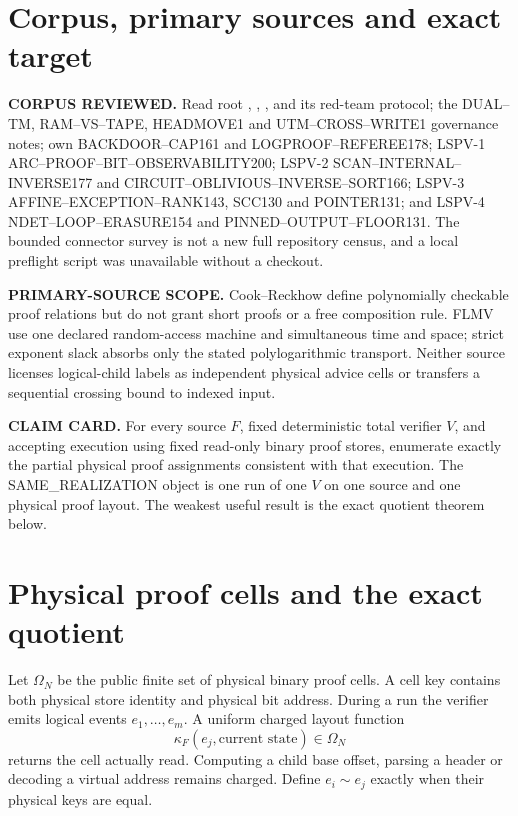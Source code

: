 \documentclass[11pt]{article}
\begin{document}
\section{Corpus, primary sources and exact target}
\textbf{CORPUS REVIEWED.}
Read root , , ,
 and its red-team protocol;
the DUAL--TM, RAM--VS--TAPE, HEADMOVE1 and UTM--CROSS--WRITE1 governance
notes; own BACKDOOR--CAP161 and LOGPROOF--REFEREE178; LSPV-1
ARC--PROOF--BIT--OBSERVABILITY200; LSPV-2 SCAN--INTERNAL--INVERSE177 and
CIRCUIT--OBLIVIOUS--INVERSE--SORT166; LSPV-3
AFFINE--EXCEPTION--RANK143, SCC130 and POINTER131; and LSPV-4
NDET--LOOP--ERASURE154 and PINNED--OUTPUT--FLOOR131. The bounded connector
survey is not a new full repository census, and a local preflight script was
unavailable without a checkout.

\textbf{PRIMARY-SOURCE SCOPE.}
Cook--Reckhow define polynomially checkable proof relations but do not grant
short proofs or a free composition rule. FLMV use one declared random-access
machine and simultaneous time and space; strict exponent slack absorbs only
the stated polylogarithmic transport. Neither source licenses logical-child
labels as independent physical advice cells or transfers a sequential
crossing bound to indexed input.

\textbf{CLAIM CARD.}
For every source $F$, fixed deterministic total verifier $V$, and accepting
execution using fixed read-only binary proof stores, enumerate exactly the
partial physical proof assignments consistent with that execution.
The SAME\_REALIZATION object is one run of one $V$ on one source and one
physical proof layout. The weakest useful result is the exact quotient
theorem below.

\section{Physical proof cells and the exact quotient}
Let $\Omega_N$ be the public finite set of physical binary proof cells.
A cell key contains both physical store identity and physical bit address.
During a run the verifier emits logical events $e_1,\ldots,e_m$. A uniform
charged layout function
\[
 \kappa_F(e_j,\text{current state})\in\Omega_N
\]
returns the cell actually read. Computing a child base offset, parsing a
header or decoding a virtual address remains charged. Define $e_i\sim e_j$
exactly when their physical keys are equal.
\end{document}
